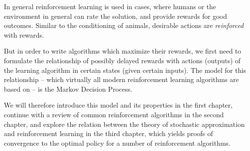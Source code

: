     In general reinforcement learning is used in cases, where humans or the environment in general can rate the solution, and provide rewards for good outcomes. Similar to the conditioning of animals, desirable actions are \emph{reinforced} with rewards. 

    But in order to write algorithms which maximize their rewards, we first need to formulate the relationship of possibly delayed rewards with actions (outputs) of the learning algorithm in certain states (given certain inputs). The model for this relationship -- which virtually all modern reinforcement learning algorithms are based on -- is the Markov Decision Process. 
    
    We will therefore introduce this model and its properties in the first chapter, continue with a review of common reinforcement algorithms in the second chapter, and explore the relation between the theory of stochastic approximation and reinforcement learning in the third chapter, which yields proofs of convergence to the optimal policy for a number of reinforcement algorithms. 
\endinput
